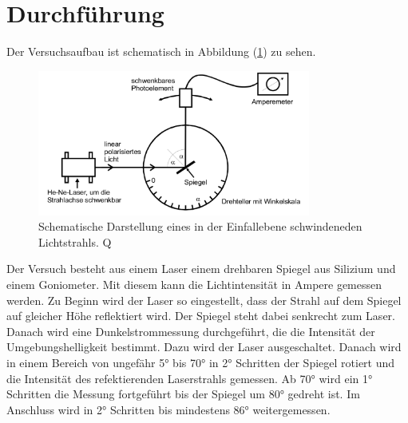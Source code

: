 \section{Durchführung}
\label{sec:Durchführung}
Der Versuchsaufbau ist schematisch in Abbildung (\ref{fig:allgemeiner_Versuchsaufbau}) zu sehen. 
\begin{figure}
    \centering
    \includegraphics[width=0.8\textwidth]{content/Bilder/Versuchsaufbau_allgemein.jpeg}
    \caption{Schematische Darstellung eines in der Einfallebene schwindeneden Lichtstrahls. Q\cite{anleitungV407}}
    \label{fig:allgemeiner_Versuchsaufbau}
\end{figure}
Der Versuch besteht aus einem Laser einem drehbaren Spiegel aus Silizium und einem Goniometer. Mit diesem kann die Lichtintensität in Ampere gemessen werden. 
Zu Beginn wird der Laser so eingestellt, dass der Strahl auf dem Spiegel auf gleicher Höhe reflektiert wird. Der Spiegel steht dabei senkrecht zum 
Laser. Danach wird eine Dunkelstrommessung durchgeführt, die 
die Intensität der Umgebungshelligkeit bestimmt. Dazu wird der Laser ausgeschaltet. 
Danach wird in einem Bereich von ungefähr 5° bis 70° in 2° Schritten der Spiegel rotiert und die Intensität des refektierenden Laserstrahls gemessen. Ab 70° wird ein 
1° Schritten die Messung fortgeführt bis der Spiegel um 80° gedreht ist. Im Anschluss wird in 2° Schritten bis mindestens 86° weitergemessen. 